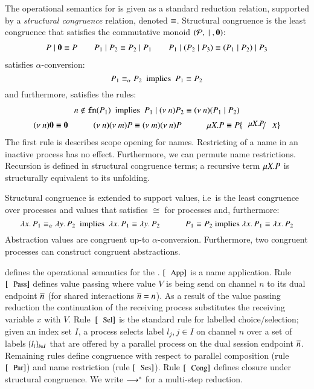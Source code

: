 The operational semantics for \HOp is given as a standard reduction relation,
supported by a \emph{structural congruence} relation, denoted $\equiv$. 
Structural congruence is 
the least congruence that satisfies the commutative monoid $(\mathcal{P}, \;|\;, \mathbf{0})$:
%
\[
\begin{array}{c}
	P \;|\; \mathbf{0} \equiv P
	\qquad
	P_1 \;|\; P_2 \equiv P_2 \;|\; P_1
	\qquad
	P_1 \;|\; (P_2 \;|\; P_3) \equiv (P_1 \;|\; P_2) \;|\; P_3
\end{array}
\]
%
\noi satisfies $\alpha$-conversion:
\[
	P_1 \equiv_\alpha P_2\ \textrm{  implies  }\ P_1 \equiv P_2
\]
\noi and furthermore, satisfies the rules:
%
\[
\begin{array}{c}
	n \notin \fn{P_1}\ \textrm{  implies  }\ P_1 \Par \news{n} P_2 \scong \news{n}(P_1 \Par P_2)
	\\[2mm]
	\news{n} \inact \scong \inact
	\qquad \quad
	\news{n} \news{m} P \scong \news{m} \news{n} P
	\qquad \quad
	\recp{X}{P} \scong P\subst{\recp{X}{P}}{\varp{X}}
\end{array}
\]
\noi The first rule is describes scope opening for names.
Restricting of a name in an inactive process has no effect.
Furthermore, we can permute name restrictions.
Recursion is defined in structural congruence terms;
a recursive term $\mu X. P$ is structurally
equivalent to its unfolding.

Structural congruence is extended to support values,
i.e~is the least congruence over processes and values
that satisfies $\cong$ for processes and, furthermore:
%
\[
	\lambda x.\,P_1 \equiv_\alpha \lambda y.\,P_2\ \textrm{ implies }\ \lambda x.\,P_1 \equiv \lambda y.\,P_2
	\qquad \quad
	P_1 \equiv P_2 \textrm{ implies } \lambda x.\,P_1 \equiv \lambda x.\,P_2
\]
%
\noi Abstraction values are congruent up-to $\alpha$-conversion.
Furthermore, two congruent processes can construct congruent
abstractions.





 defines
the operational semantics for the \HOp.
$\orule{App}$ is a name application.
Rule~$\orule{Pass}$ defines value passing where
value $V$ is being send on channel $n$ to its dual endpoint $\overline{n}$
(for shared interactions $\overline{n} = n$).
As a result of the value passing reduction the continuation of the 
receiving process substitutes the receiving variable $x$ with $V$.
Rule~$\orule{Sel}$ is the standard rule for labelled choice/selection;
given an index set $I$,
a process selects label $l_j, j \in I$ on channel $n$ over a set of
labels $\{l_i\}_{i \in I}$ that are offered by a parallel process
on the dual session endpoint $\overline{n}$.
Remaining rules define congruence 
with respect to parallel composition (rule $\orule{Par}$)
and name restriction (rule $\orule{Ses}$).
Rule $\orule{Cong}$ defines closure under structural congruence.
We write $\longrightarrow^\ast$ for a multi-step reduction. 

